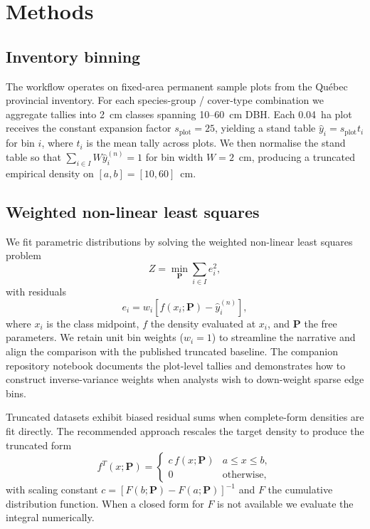 \section{Methods}
\label{sec:methods}

\subsection{Inventory binning}
\label{sec:methods_binning}

The workflow operates on fixed-area permanent sample plots from the Qu\'ebec provincial inventory. For each species-group / cover-type combination we aggregate tallies into 2~cm classes spanning 10--60~cm DBH. Each 0.04~ha plot receives the constant expansion factor $s_{\text{plot}} = 25$, yielding a stand table $\hat{y}_i = s_{\text{plot}} t_i$ for bin $i$, where $t_i$ is the mean tally across plots. We then normalise the stand table so that $\sum_{i \in I} W \hat{y}_i^{(n)} = 1$ for bin width $W = 2$~cm, producing a truncated empirical density on $[a, b] = [10, 60]$~cm.

\subsection{Weighted non-linear least squares}
\label{sec:methods_nlls}

We fit parametric distributions by solving the weighted non-linear least squares problem
\begin{equation}
  Z = \min_{\bm{P}} \sum_{i \in I} e_i^2,
\end{equation}
with residuals
\begin{equation}
  e_i = w_i \left[f(x_i; \bm{P}) - \hat{y}_i^{(n)}\right],
\end{equation}
where $x_i$ is the class midpoint, $f$ the density evaluated at $x_i$, and $\bm{P}$ the free parameters. We retain unit bin weights ($w_i = 1$) to streamline the narrative and align the comparison with the published truncated baseline. The companion repository notebook documents the plot-level tallies and demonstrates how to construct inverse-variance weights when analysts wish to down-weight sparse edge bins.

Truncated datasets exhibit biased residual sums when complete-form densities are fit directly. The recommended approach rescales the target density to produce the truncated form
\begin{equation}
  f^{T}(x; \bm{P}) =
    \begin{cases}
      c\, f(x; \bm{P}) & a \leq x \leq b, \\
      0 & \text{otherwise},
    \end{cases}
\end{equation}
with scaling constant $c = [F(b; \bm{P}) - F(a; \bm{P})]^{-1}$ and $F$ the cumulative distribution function. When a closed form for $F$ is not available we evaluate the integral numerically.

